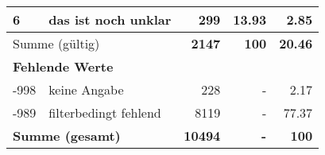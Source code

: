 \begin{longtable}{lXrrr}
     6 &
     \multicolumn{1}{X}{ das ist noch unklar   } &


       \num{299} &
       \num[round-mode=places,round-precision=2]{13,93} &
         \num[round-mode=places,round-precision=2]{2,85} \\
     \midrule
     \multicolumn{2}{l}{Summe (gültig)} &
       \textbf{\num{2147}} &
     \textbf{100} &
       \textbf{\num[round-mode=places,round-precision=2]{20,46}} \\
     \multicolumn{5}{l}{\textbf{Fehlende Werte}}\\
       -998 &
       keine Angabe &
         \num{228} &
        - &
         \num[round-mode=places,round-precision=2]{2,17} \\
       -989 &
       filterbedingt fehlend &
         \num{8119} &
        - &
         \num[round-mode=places,round-precision=2]{77,37} \\
     \midrule
     \multicolumn{2}{l}{\textbf{Summe (gesamt)}} &
          \textbf{\num{10494}} &
        \textbf{-} &
        \textbf{100} \\
     \bottomrule
     \end{longtable}
     
